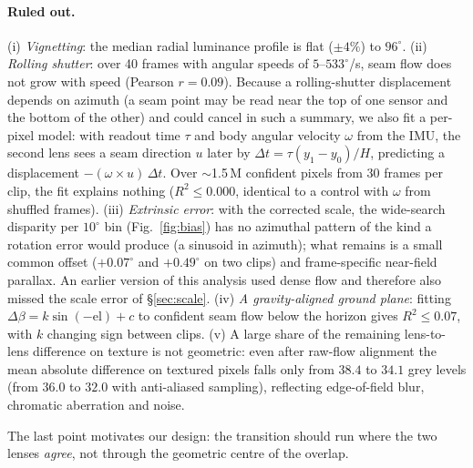 \documentclass[11pt]{article}
\begin{document}
\paragraph{Ruled out.} (i) \emph{Vignetting}: the median radial luminance profile is flat ($\pm4\%$) to $96^\circ$. (ii) \emph{Rolling shutter}: over 40 frames with angular speeds of $5$--$533^\circ$/s, seam flow does not grow with speed (Pearson $r=0.09$). Because a rolling-shutter displacement depends on azimuth (a seam point may be read near the top of one sensor and the bottom of the other) and could cancel in such a summary, we also fit a per-pixel model: with readout time $\tau$ and body angular velocity $\omega$ from the IMU, the second lens sees a seam direction $u$ later by $\Delta t=\tau(y_1-y_0)/H$, predicting a displacement $-(\omega\times u)\,\Delta t$. Over $\sim$1.5\,M confident pixels from 30 frames per clip, the fit explains nothing ($R^2\le0.000$, identical to a control with $\omega$ from shuffled frames). (iii) \emph{Extrinsic error}: with the corrected scale, the wide-search disparity per $10^\circ$ bin (Fig.~\ref{fig:bias}) has no azimuthal pattern of the kind a rotation error would produce (a sinusoid in azimuth); what remains is a small common offset ($+0.07^\circ$ and $+0.49^\circ$ on two clips) and frame-specific near-field parallax. An earlier version of this analysis used dense flow and therefore also missed the scale error of \S\ref{sec:scale}. (iv) \emph{A gravity-aligned ground plane}: fitting $\Delta\beta = k\sin(-\mathrm{el}) + c$ to confident seam flow below the horizon gives $R^2\le0.07$, with $k$ changing sign between clips. (v) A large share of the remaining lens-to-lens difference on texture is not geometric: even after raw-flow alignment the mean absolute difference on textured pixels falls only from $38.4$ to $34.1$ grey levels (from $36.0$ to $32.0$ with anti-aliased sampling), reflecting edge-of-field blur, chromatic aberration and noise.

The last point motivates our design: the transition should run where the two lenses \emph{agree}, not through the geometric centre of the overlap.
\end{document}
